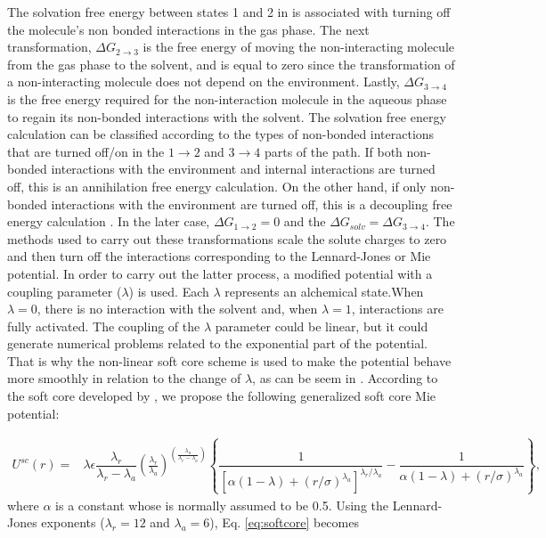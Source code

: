 	The solvation free energy between states 1 and 2 in  is associated with turning off the molecule's non bonded interactions in the gas phase. The next transformation, $\Delta G_{2 \rightarrow 3}$ is the free energy of moving the non-interacting molecule from the gas phase to the solvent, and is equal to zero since the transformation of a non-interacting molecule does not depend on the environment. Lastly, $\Delta G_{3 \rightarrow 4}$ is the free energy required for the non-interaction molecule in the aqueous phase to regain its non-bonded interactions with the solvent.  The solvation free energy calculation can be classified according to the types of non-bonded interactions that are turned off/on in the $1 \rightarrow 2$ and $ 3 \rightarrow 4$ parts of the path. If both non-bonded interactions with the environment and internal interactions are turned off, this is an annihilation free energy calculation. On the other hand, if only non-bonded interactions with the environment are turned off, this is a decoupling free energy calculation \cite{klimovich}. In the later case, $\Delta G_{1 \rightarrow 2} = 0$ and the $\Delta G_{solv} = \Delta G_{3 \rightarrow 4} $. The methods used to carry out these transformations scale the solute charges to zero and then turn off the interactions corresponding to the Lennard-Jones or Mie potential. In order to carry out the latter process, a modified potential with a coupling parameter ($\lambda$) is used. Each $\lambda$ represents an alchemical state.When $\lambda=0$, there is no interaction with the solvent and, when $\lambda=1$, interactions are fully activated. The coupling of the $\lambda$ parameter could be linear, but it could generate numerical problems related to the exponential part of the potential.  That is why the non-linear soft core scheme \cite{beutler1994} is used to make the potential behave more smoothly in relation to the change of $\lambda$, as can be seem in . According to the soft core developed by , we propose the following generalized soft core Mie potential:
	
	\begin{equation}
	\label{eq:softcore}
	\begin{aligned}
	U^{sc}(r) {}=& \lambda\epsilon\dfrac{\lambda_r}{\lambda_r - \lambda_a} \left(\frac{\lambda_r}{\lambda_a} \right)^{\left( \frac{\lambda_a}{\lambda_r - \lambda_a} \right)} \left\lbrace\dfrac{1}{\left[\alpha(1-\lambda)+ (r/\sigma)^{\lambda_a}\right]^{\lambda_{r}/\lambda_{a}}} - \dfrac{1}{\alpha(1-\lambda)+(r/\sigma)^{\lambda_a}}\right\rbrace,
	\end{aligned}
	\end{equation}
	where $\alpha$ is a constant whose is  normally assumed to be 0.5. Using the Lennard-Jones exponents ($\lambda _{r} =12$ and $\lambda _{a} = 6$), Eq. \eqref{eq:softcore} becomes
	
